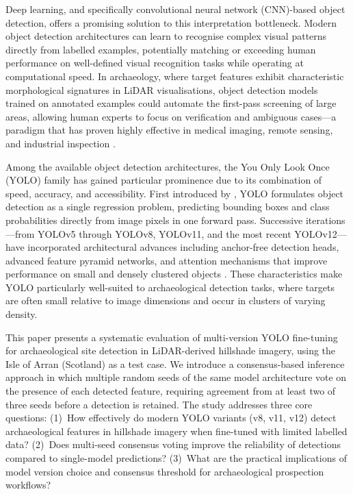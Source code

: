 \documentclass[12pt,a4paper]{article}
\begin{document}
Deep learning, and specifically convolutional neural network (CNN)-based object detection,
offers a promising solution to this interpretation bottleneck. Modern object detection
architectures can learn to recognise complex visual patterns directly from labelled examples,
potentially matching or exceeding human performance on well-defined visual recognition tasks
while operating at computational speed. In archaeology, where target features exhibit
characteristic morphological signatures in LiDAR visualisations, object detection models trained
on annotated examples could automate the first-pass screening of large areas, allowing human
experts to focus on verification and ambiguous cases---a paradigm that has proven highly
effective in medical imaging, remote sensing, and industrial inspection \citep{kadhim2023critical}.

Among the available object detection architectures, the You Only Look Once (YOLO) family has
gained particular prominence due to its combination of speed, accuracy, and accessibility.
First introduced by \citet{redmon2016you}, YOLO formulates object detection as a single
regression problem, predicting bounding boxes and class probabilities directly from image
pixels in one forward pass. Successive iterations---from YOLOv5 through YOLOv8, YOLOv11, and
the most recent YOLOv12---have incorporated architectural advances including anchor-free
detection heads, advanced feature pyramid networks, and attention mechanisms that improve
performance on small and densely clustered objects \citep{jocher2023ultralytics}. These
characteristics make YOLO particularly well-suited to archaeological detection tasks, where
targets are often small relative to image dimensions and occur in clusters of varying density.

This paper presents a systematic evaluation of multi-version YOLO fine-tuning for
archaeological site detection in LiDAR-derived hillshade imagery, using the Isle of Arran
(Scotland) as a test case. We introduce a consensus-based inference approach in which
multiple random seeds of the same model architecture vote on the presence of each detected
feature, requiring agreement from at least two of three seeds before a detection is
retained. The study addresses three core questions: (1)~How effectively do modern YOLO
variants (v8, v11, v12) detect archaeological features in hillshade imagery when fine-tuned
with limited labelled data? (2)~Does multi-seed consensus voting improve the reliability of
detections compared to single-model predictions? (3)~What are the practical implications of
model version choice and consensus threshold for archaeological prospection workflows?
\end{document}
